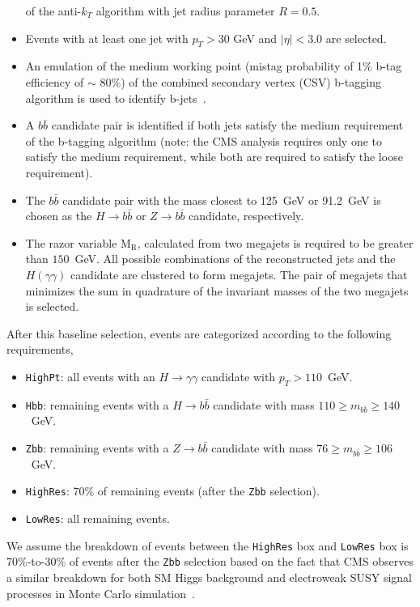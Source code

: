 \begin{itemize}
  of the anti-$k_T$\cite{antikt} algorithm with jet radius parameter $R=0.5$.
\item Events with at least one jet with $p_T>30$ GeV and $|\eta|<3.0$
  are selected.
\item An emulation of the medium working point (mistag probability of
  1\% b-tag efficiency of $\sim$ 80\%) of the combined secondary vertex (CSV) b-tagging
  algorithm is used to identify b-jets~\cite{btag8TeV}.
\item A $b \bar{b}$ candidate pair is identified if both jets satisfy the medium requirement of
  the b-tagging algorithm (note: the CMS analysis requires only one to
  satisfy the medium requirement, while both are required to satisfy
  the loose requirement).
\item The $b \bar{b}$ candidate pair with the mass closest to 125~GeV or 91.2~GeV is chosen as the $H\to
  b \bar{b}$ or $Z\to b\bar{b}$ candidate, respectively.
\item The razor variable $\mathrm{M_R}$, calculated from two megajets is required to be greater than
  $150$~GeV. All possible combinations of the reconstructed jets and
the $H(\gamma\gamma)$ candidate are clustered to form megajets. The pair of megajets that
minimizes the sum in quadrature of the invariant masses of the two megajets is selected.
\end{itemize}

After this baseline selection, events are categorized according to the
following requirements,
\begin{itemize}
\item \texttt{HighPt}: all events with an $H\to\gamma\gamma$ candidate
  with $p_{T}>110$~GeV. 
\item \texttt{Hbb}: remaining events with a $H\to b\bar{b}$ candidate
  with mass $110\geq m_{b\bar{b}}\geq 140$~GeV. 
\item \texttt{Zbb}: remaining events with a $Z\to b\bar{b}$ candidate
  with mass $76\geq m_{b\bar{b}}\geq 106$~GeV. 
\item \texttt{HighRes}: 70\% of remaining events (after the \texttt{Zbb} selection). 
\item \texttt{LowRes}: all remaining events. 
\end{itemize}
We assume the breakdown of events between the \texttt{HighRes} box and \texttt{LowRes}
box is 70\%-to-30\% of events after the \texttt{Zbb} selection based on the fact that CMS 
observes a similar breakdown for both SM Higgs background and
electroweak SUSY signal processes in Monte Carlo simulation~\cite{RazorHgaga}.

